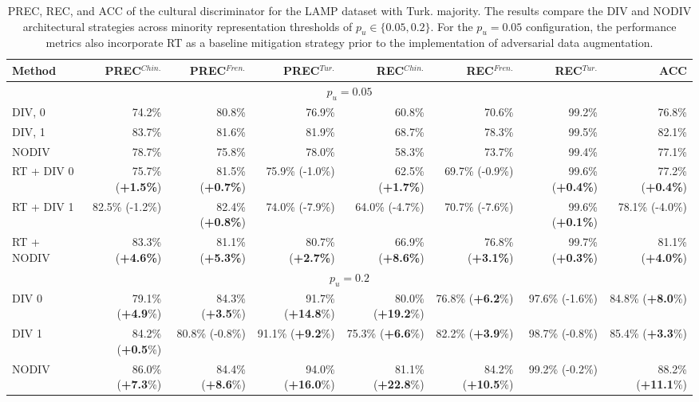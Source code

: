 %
%
\begin{table}
\centering
\scriptsize
\setlength{\tabcolsep}{0.1cm}
\begin{tabular}{lrrrrrrr}
\toprule
\textbf{Method} & \textbf{PREC}$^{Chin.}$  & \textbf{PREC}$^{Fren.}$ & \textbf{PREC}$^{Tur.}$ & \textbf{REC}$^{Chin.}$ & \textbf{REC}$^{Fren.}$ & \textbf{REC}$^{Tur.}$ &  \textbf{ACC}\\
\midrule
\multicolumn{8}{c}{$p_u=0.05$} \\
\midrule
DIV, 0 & 74.2\%&	80.8\%&	76.9\%	&	60.8\%	&	70.6\%	&	99.2\%	&	76.8\%	\\
DIV, 1 & 83.7\%	&	81.6\%&	81.9\%	&	68.7\%	&	78.3\%	&	99.5\%&	82.1\%	\\
NODIV & 78.7\%	&	75.8\%&	78.0\%&	58.3\%&	73.7\%&	99.4\%&	77.1\%\\
\midrule
RT + DIV 0      & 75.7\% (\textbf{+1.5\%}) & 81.5\% (\textbf{+0.7\%}) & 75.9\% (-1.0\%) & 62.5\% (\textbf{+1.7\%}) & 69.7\% (-0.9\%) & 99.6\% (\textbf{+0.4\%}) & 77.2\% (\textbf{+0.4\%}) \\
RT + DIV 1      & 82.5\% (-1.2\%) & 82.4\% (\textbf{+0.8\%}) & 74.0\% (-7.9\%) & 64.0\% (-4.7\%) & 70.7\% (-7.6\%) & 99.6\% (\textbf{+0.1\%}) & 78.1\% (-4.0\%) \\
RT + NODIV      & 83.3\% (\textbf{+4.6\%}) & 81.1\% (\textbf{+5.3\%}) & 80.7\% (\textbf{+2.7\%}) & 66.9\% (\textbf{+8.6\%}) & 76.8\% (\textbf{+3.1\%}) & 99.7\% (\textbf{+0.3\%}) & 81.1\% (\textbf{+4.0\%}) \\
\midrule
\multicolumn{8}{c}{$p_u=0.2$} \\
\midrule
DIV 0           & 79.1\% (\textbf{+4.9}\%) & 84.3\% (\textbf{+3.5}\%) & 91.7\% (\textbf{+14.8}\%) & 80.0\% (\textbf{+19.2}\%) & 76.8\% (\textbf{+6.2}\%) & 97.6\% (-1.6\%) & 84.8\% (\textbf{+8.0}\%) \\
DIV 1           & 84.2\% (\textbf{+0.5}\%) & 80.8\% (-0.8\%) & 91.1\% (\textbf{+9.2}\%) & 75.3\% (\textbf{+6.6}\%) & 82.2\% (\textbf{+3.9}\%) & 98.7\% (-0.8\%) & 85.4\% (\textbf{+3.3}\%) \\
NODIV           & 86.0\% (\textbf{+7.3}\%) & 84.4\% (\textbf{+8.6}\%) & 94.0\% (\textbf{+16.0}\%) & 81.1\% (\textbf{+22.8}\%) & 84.2\% (\textbf{+10.5}\%) & 99.2\% (-0.2\%) & 88.2\% (\textbf{+11.1}\%) \\
\bottomrule
\end{tabular}
\caption{PREC, REC, and ACC of the cultural discriminator for the LAMP dataset with Turk. majority. The results compare the DIV and NODIV architectural strategies across minority representation thresholds of $p_u \in \{0.05, 0.2\}$. For the $p_u = 0.05$ configuration, the performance metrics also incorporate RT as a baseline mitigation strategy prior to the implementation of adversarial data augmentation.}
\label{ch3:tab:discr:LT}
\end{table}
